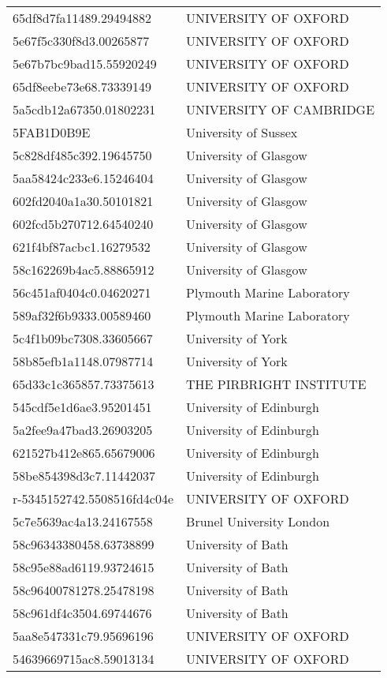 \begin{tabular}{ll}
65df8d7fa11489.29494882 & UNIVERSITY OF OXFORD \\
5e67f5c330f8d3.00265877 & UNIVERSITY OF OXFORD \\
5e67b7bc9bad15.55920249 & UNIVERSITY OF OXFORD \\
65df8eebe73e68.73339149 & UNIVERSITY OF OXFORD \\
5a5cdb12a67350.01802231 & UNIVERSITY OF CAMBRIDGE \\
5FAB1D0B9E & University of Sussex \\
5c828df485c392.19645750 & University of Glasgow \\
5aa58424c233e6.15246404 & University of Glasgow \\
602fd2040a1a30.50101821 & University of Glasgow \\
602fcd5b270712.64540240 & University of Glasgow \\
621f4bf87acbc1.16279532 & University of Glasgow \\
58c162269b4ac5.88865912 & University of Glasgow \\
56c451af0404c0.04620271 & Plymouth Marine Laboratory \\
589af32f6b9333.00589460 & Plymouth Marine Laboratory \\
5c4f1b09bc7308.33605667 & University of York \\
58b85efb1a1148.07987714 & University of York \\
65d33c1c365857.73375613 & THE PIRBRIGHT INSTITUTE \\
545cdf5e1d6ae3.95201451 & University of Edinburgh \\
5a2fee9a47bad3.26903205 & University of Edinburgh \\
621527b412e865.65679006 & University of Edinburgh \\
58be854398d3c7.11442037 & University of Edinburgh \\
r-5345152742.5508516fd4c04e & UNIVERSITY OF OXFORD \\
5c7e5639ac4a13.24167558 & Brunel University London \\
58c96343380458.63738899 & University of Bath \\
58c95e88ad6119.93724615 & University of Bath \\
58c96400781278.25478198 & University of Bath \\
58c961df4c3504.69744676 & University of Bath \\
5aa8e547331c79.95696196 & UNIVERSITY OF OXFORD \\
54639669715ac8.59013134 & UNIVERSITY OF OXFORD \\

\end{tabular}
